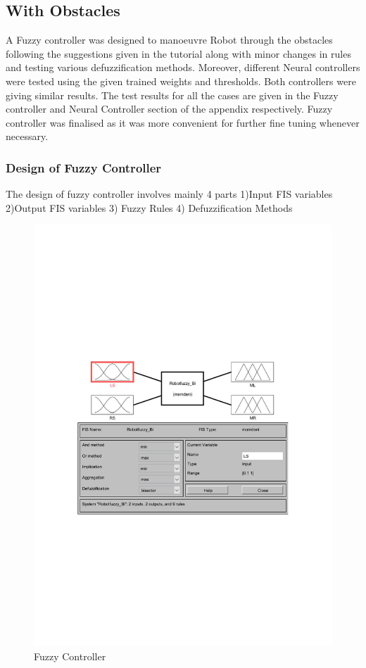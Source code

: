 \documentclass{l4proj}
\begin{document}
\newpage
\subsection{With Obstacles}

A Fuzzy controller was designed to manoeuvre Robot through the obstacles following the suggestions given in the tutorial along with minor changes in rules and testing various defuzzification methods. Moreover, different Neural controllers were tested using the given trained weights and thresholds. Both controllers were giving similar results. The test results for all the cases are given in the Fuzzy controller and Neural Controller section of the appendix respectively. Fuzzy controller was finalised as it was more convenient for further fine tuning whenever necessary. 

\subsubsection{Design of Fuzzy Controller}

The design of fuzzy controller involves mainly 4 parts 1)Input FIS variables 2)Output FIS variables 3) Fuzzy Rules 4) Defuzzification Methods
\begin{figure}[htb]
    \centering
    \includegraphics[width=0.5\linewidth]{images/fuzzy tool box.pdf}

    \caption{Fuzzy Controller
    }

    \label{fig:Rootlocus} 
\end{figure}
\end{document}
